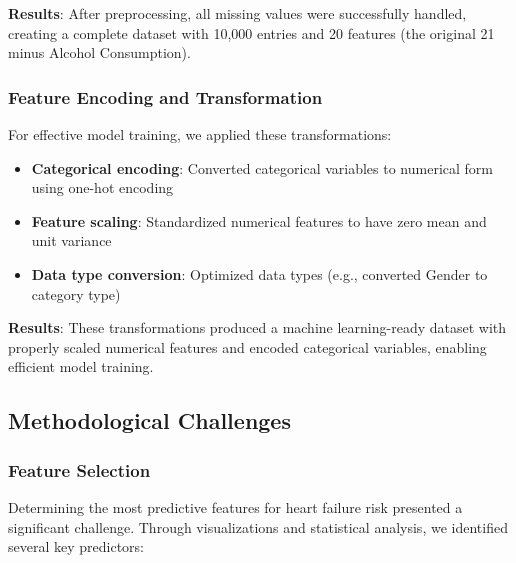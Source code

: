 \documentclass[11pt,a4paper]{article}
\begin{document}
\textbf{Results}: After preprocessing, all missing values were successfully handled, creating a complete dataset with 10,000 entries and 20 features (the original 21 minus Alcohol Consumption).

\subsubsection{Feature Encoding and Transformation}
\vspace{-0.25cm}

For effective model training, we applied these transformations:

\vspace{-0.25cm}
\begin{itemize}
    \vspace{-0.25cm}
    \item \textbf{Categorical encoding}: Converted categorical variables to numerical form using one-hot encoding
          \vspace{-0.25cm}
    \item \textbf{Feature scaling}: Standardized numerical features to have zero mean and unit variance
          \vspace{-0.25cm}
    \item \textbf{Data type conversion}: Optimized data types (e.g., converted Gender to category type)
\end{itemize}
\vspace{-0.25cm}
\textbf{Results}: These transformations produced a machine learning-ready dataset with properly scaled numerical features and encoded categorical variables, enabling efficient model training.

\subsection{Methodological Challenges}

\subsubsection{Feature Selection}
\vspace{-0.25cm}
Determining the most predictive features for heart failure risk
presented a significant challenge. Through visualizations and statistical analysis, we identified several key predictors:
\end{document}

